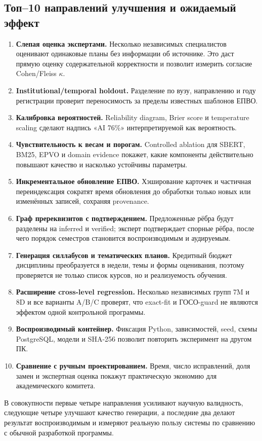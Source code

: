 \documentclass[twoside,11pt]{article}
\begin{document}
\subsection{Топ--10 направлений улучшения и ожидаемый эффект}
\begin{enumerate}
  \item \textbf{Слепая оценка экспертами.} Несколько независимых специалистов
  оценивают одинаковые планы без информации об источнике. Это даст прямую оценку
  содержательной корректности и позволит измерить согласие Cohen/Fleiss $\kappa$.
  \item \textbf{Institutional/temporal holdout.} Разделение по вузу, направлению
  и году регистрации проверит переносимость за пределы известных шаблонов ЕПВО.
  \item \textbf{Калибровка вероятностей.} Reliability diagram, Brier score и
  temperature scaling сделают надпись «AI 76\%» интерпретируемой как вероятность.
  \item \textbf{Чувствительность к весам и порогам.} Controlled ablation для
  SBERT, BM25, EPVO и domain evidence покажет, какие компоненты действительно
  повышают качество и насколько устойчивы параметры.
  \item \textbf{Инкрементальное обновление ЕПВО.} Хэширование карточек и частичная
  переиндексация сократят время обновления до обработки только новых или изменённых
  записей, сохраняя provenance.
  \item \textbf{Граф пререквизитов с подтверждением.} Предложенные рёбра будут
  разделены на inferred и verified; эксперт подтверждает спорные рёбра, после чего
  порядок семестров становится воспроизводимым и аудируемым.
  \item \textbf{Генерация силлабусов и тематических планов.} Кредитный бюджет
  дисциплины преобразуется в недели, темы и формы оценивания, поэтому проверяется
  не только список курсов, но и реализуемость обучения.
  \item \textbf{Расширение cross-level regression.} Несколько независимых групп
  7M и 8D и все варианты A/B/C проверят, что exact-fit и ГОСО-guard не являются
  эффектом одной контрольной программы.
  \item \textbf{Воспроизводимый контейнер.} Фиксация Python, зависимостей, seed,
  схемы PostgreSQL, модели и SHA-256 позволит повторить эксперимент на другом ПК.
  \item \textbf{Сравнение с ручным проектированием.} Время, число исправлений,
  доля замен и экспертная оценка покажут практическую экономию для академического
  комитета.
\end{enumerate}
В совокупности первые четыре направления усиливают научную валидность, следующие
четыре улучшают качество генерации, а последние два делают результат воспроизводимым
и измеряют реальную пользу системы по сравнению с обычной разработкой программы.
\end{document}

